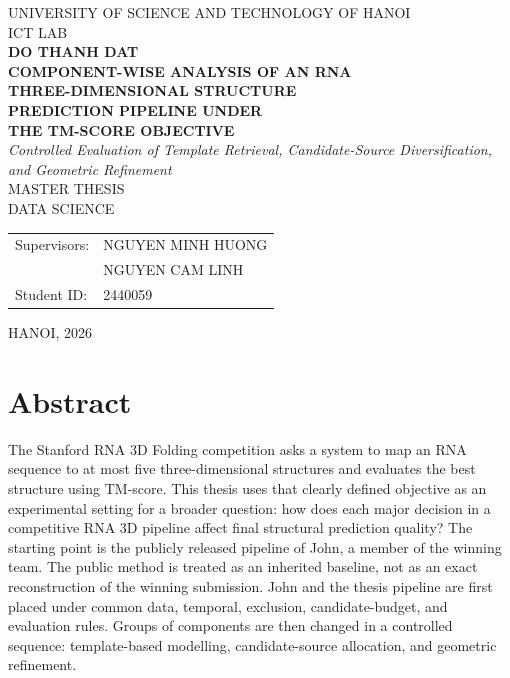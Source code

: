 \documentclass[12pt,a4paper,oneside]{report}
\begin{document}
\begin{titlepage}
\begin{center}
  {\large UNIVERSITY OF SCIENCE AND TECHNOLOGY OF HANOI}\\[0.25cm]
  {\large ICT LAB}\\[1.6cm]
  {\Large\bfseries DO THANH DAT}\\[1.5cm]
  {\Large\bfseries
  COMPONENT-WISE ANALYSIS OF AN RNA\\
  THREE-DIMENSIONAL STRUCTURE\\
  PREDICTION PIPELINE UNDER\\
  THE TM-SCORE OBJECTIVE
  }\\[1.0cm]
  {\large\itshape
  Controlled Evaluation of Template Retrieval, Candidate-Source Diversification,
  and Geometric Refinement
  }\\[1.5cm]
  {\large MASTER THESIS}\\[0.5cm]
  {\large DATA SCIENCE}\\[1.6cm]
  \begin{tabularx}{0.94\textwidth}{lX}
  Supervisors: & NGUYEN MINH HUONG\\
  & NGUYEN CAM LINH\\
  Student ID: & 2440059
  \end{tabularx}
  \vfill
  {\large HANOI, 2026}
\end{center}
\end{titlepage}


\chapter*{Abstract}

The Stanford RNA 3D Folding competition asks a system to map an RNA sequence to at
most five three-dimensional structures and evaluates the best structure using
TM-score. This thesis uses that clearly defined objective as an experimental setting
for a broader question: how does each major decision in a competitive RNA 3D pipeline
affect final structural prediction quality? The starting point is the publicly
released pipeline of John, a member of the winning team. The public method is treated
as an inherited baseline, not as an exact reconstruction of the winning submission.
John and the thesis pipeline are first placed under common data, temporal, exclusion,
candidate-budget, and evaluation rules. Groups of components are then changed in a
controlled sequence: template-based modelling, candidate-source allocation, and
geometric refinement.
\end{document}
